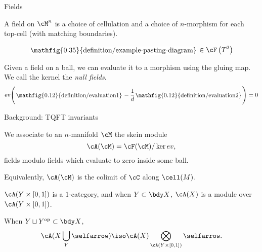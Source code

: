 \documentclass[beamer, compress]{beamer}
\begin{document}
\newcommand{\roundframe}[1]{\begin{tikzpicture}[baseline=-2pt]\node[rectangle,inner sep=1pt,rounded corners,fill=white] {#1};\end{tikzpicture}}

\begin{frame}{Fields}
\begin{block}{}
A field on $\cM^n$ is a choice of cellulation and a choice of $n$-morphism for each top-cell (with matching boundaries).
\end{block}
\begin{example}[$\cC = \text{TL}_d$ the Temperley-Lieb category]
$$\roundframe{\mathfig{0.35}{definition/example-pasting-diagram}} \in \cF\left(T^2\right)$$
\end{example}
\begin{block}{}
Given a field on a ball, we can evaluate it to a morphism using the gluing map. We call the kernel the \emph{null fields}.
\vspace{-3mm}
$$\text{ev}\Bigg(\roundframe{\mathfig{0.12}{definition/evaluation1}} - \frac{1}{d}\roundframe{\mathfig{0.12}{definition/evaluation2}}\Bigg) = 0$$
\end{block}
\end{frame}

\begin{frame}{Background: TQFT invariants}
\begin{defn}
We associate to an $n$-manifold $\cM$ the skein module
\vspace{-1mm}
$$\cA(\cM) = \cF(\cM) / \ker{ev},\vspace{-1mm}$$
fields modulo fields which evaluate to zero inside some ball.
\end{defn}
Equivalently, $\cA(\cM)$ is the colimit of $\cC$ along $\cell(M)$.

\vspace{4mm}
$\cA(Y \times [0,1])$ is a $1$-category, and when $Y \subset \bdy X$, $\cA(X)$ is a module over $\cA(Y \times [0,1])$.
\begin{thm}
When $Y \sqcup Y^{\text{op}} \subset \bdy X$,
\vspace{-1mm}
\[
	\cA(X \bigcup_Y \selfarrow) \iso \cA(X) \bigotimes_{\cA(Y \times [0,1])} \selfarrow.
\]
\end{thm}
\end{frame}
\end{document}

